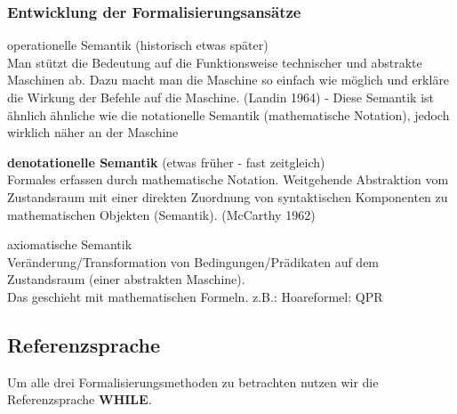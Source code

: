 \subsubsection*{Entwicklung der Formalisierungsansätze}
\begin{compactitem}
	\item operationelle Semantik (historisch etwas später)\\
	Man stützt die Bedeutung auf die Funktionsweise technischer und abstrakte Maschinen ab. Dazu macht man die Maschine so einfach wie möglich und erkläre die Wirkung der Befehle auf die Maschine. (Landin 1964) - Diese Semantik ist ähnlich ähnliche wie die notationelle Semantik (mathematische Notation), jedoch wirklich näher an der Maschine\\
	\item \textbf{denotationelle Semantik} (etwas früher - fast zeitgleich)\\ 
	Formales erfassen durch mathematische Notation. Weitgehende Abstraktion vom Zustandsraum mit einer direkten Zuordnung von syntaktischen Komponenten zu mathematischen Objekten (Semantik). (McCarthy 1962)\\
	\item axiomatische Semantik\\
	Veränderung/Transformation von Bedingungen/Prädikaten auf dem Zustandsraum (einer abstrakten Maschine).\\
	Das geschieht mit mathematischen Formeln. z.B.: Hoareformel: {Q}P{R}\\
\end{compactitem}

\subsection{Referenzsprache}
Um alle drei Formalisierungsmethoden zu betrachten nutzen wir die Referenzsprache \textbf{WHILE}.
